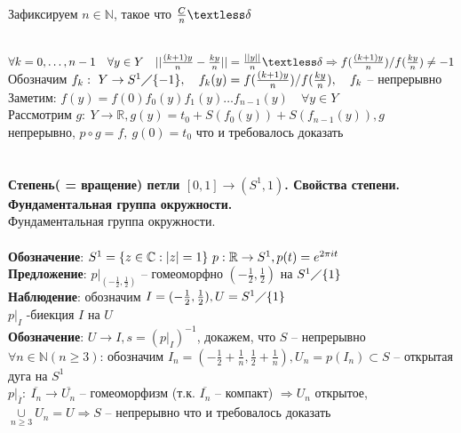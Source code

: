 	Зафиксируем $n\in \mathbb{N}$, такое что $\frac{C}{n} \textless \delta$\\
	\begin{figure}[h]
	\end{figure}\\
	$\forall k = 0, \ldots , n-1\quad \forall y\in Y\quad || \frac{(k+1)y}{n} - \frac{ky}{n}|| = \frac{||y||}{n} \textless \delta \Rightarrow f(\frac{(k+1)y}{n})\slash f(\frac{ky}{n}) \neq -1$\\
	Обозначим $f_k:\ Y \rightarrow S^1 \diagup \{-1\},\quad f_k (y) = f(\frac{(k+1)y}{n})\slash f(\frac{ky}{n}),\quad f_k$ -- непрерывно\\
	Заметим: $f(y) = f(0) f_0 (y) f_1 (y) \ldots  f_{n-1} (y)\quad \forall y\in Y$\\
	Рассмотрим $g:\ Y\rightarrow \mathbb{R}, g(y) = t_0 + S(f_0 (y)) + S(f_{n-1} (y)), g$ непрерывно, $p \circ g = f,\ g(0) = t_0$ что и требовалось доказать
	


\newpage
\section{} 
	\textbf{Степень( = вращение) петли $[0,1] \rightarrow (S^1, 1)$. Свойства степени. Фундаментальная группа окружности.}\\
	Фундаментальная группа окружности.\\
	\\
	\textbf{Обозначение}: $S^1 = \{ z\in \mathbb{C}: |z| = 1\}\\\
	p: \mathbb{R} \rightarrow S^1, p(t) = e^{2\pi it}$\\
	\textbf{Предложение}: ${p|}_{(- \frac{1}{2}, \frac{1}{2})}$ -- гомеоморфно $(- \frac{1}{2}, \frac{1}{2})$ на $S^1 \diagup \{1\}$\\
	\textbf{Наблюдение}: обозначим $I = (- \frac{1}{2}, \frac{1}{2}), U = S^1 \diagup \{1\}$\\
	${p|}_I$ -биекция $I$ на $U$\\
	\textbf{Обозначение}: $U \rightarrow I, s = ({p|}_I)^{-1}$, докажем, что $S$ -- непрерывно\\
	$\forall n\in \mathbb{N} (n \geq 3)$: обозначим $I_n = (- \frac{1}{2} + \frac{1}{n}, \frac{1}{2}+ \frac{1}{n}), U_n = p(I_n) \subset S$ -- открытая дуга на $S^1$\\
	${p|}_{\overline{I}}:\ \overline{I_n} \rightarrow \overline{U_n}$ -- гомеоморфизм (т.к. $\overline{I_n}$ -- компакт) $\Rightarrow U_n$ открытое, $\underset{n \geq 3}{\cup} U_n = U \Rightarrow S$ -- непрерывно что и требовалось доказать\\
	
